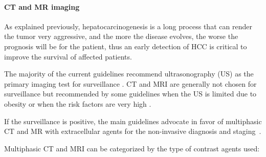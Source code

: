 \documentclass[]{article}
\let\oldparagraph\paragraph
\renewcommand{\paragraph}[1]{\oldparagraph{#1}\mbox{}}
\begin{document}
\paragraph{CT and MR imaging}\label{ct-and-mr-imaging}

As explained previously, hepatocarcinogenesis is a long process that can
render the tumor very aggressive, and the more the disease evolves, the
worse the prognosis will be for the patient, thus an early detection of
HCC is critical to improve the survival of affected patients.

The majority of the current guidelines recommend ultrasonography (US) as
the primary imaging test for surveillance \cite{Choi2014}. CT and MRI are generally not chosen for surveillance but
recommended by some guidelines when the US is limited due to obesity or
when the risk factors are very high \cite{Omata2010, Llovet2012}.

If the surveillance is positive, the main guidelines advocate in favor
of multiphasic CT and MR with extracellular agents for the non-invasive
diagnosis and staging \cite{Kudo2010, Llovet2012, Omata2010, Bruix2011}.

Multiphasic CT and MRI can be categorized by the type of contrast agents
used:
\end{document}
